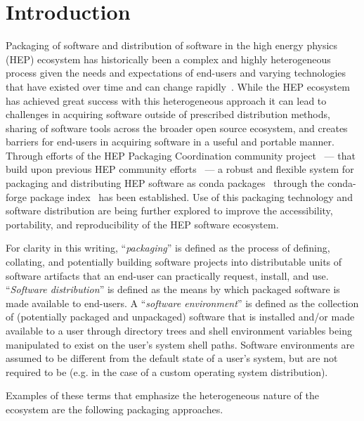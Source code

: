 \section{Introduction}\label{sec:introduction}

Packaging of software and distribution of software in the high energy physics (HEP) ecosystem has historically been a complex and highly heterogeneous process given the needs and expectations of end-users and varying technologies that have existed over time and can change rapidly~\cite{Buckley:2006nm}.
While the HEP ecosystem has achieved great success with this heterogeneous approach it can lead to challenges in acquiring software outside of prescribed distribution methods, sharing of software tools across the broader open source ecosystem, and creates barriers for end-users in acquiring software in a useful and portable manner.
Through efforts of the HEP Packaging Coordination community project~\cite{matthew_feickert_chep_2026} --- that build upon previous HEP community efforts~\cite{Burr:2699537} --- a robust and flexible system for packaging and distributing HEP software as conda packages~\cite{conda_software} through the conda-forge package index~\cite{conda_forge} has been established.
Use of this packaging technology and software distribution are being further explored to improve the accessibility, portability, and reproducibility of the HEP software ecosystem.

For clarity in this writing, ``\emph{packaging}'' is defined as the process of defining, collating, and potentially building software projects into distributable units of software artifacts that an end-user can practically request, install, and use.
``\emph{Software distribution}'' is defined as the means by which packaged software is made available to end-users.
A ``\emph{software environment}'' is defined as the collection of (potentially packaged and unpackaged) software that is installed and/or made available to a user through directory trees and shell environment variables being manipulated to exist on the user's system shell paths.
Software environments are assumed to be different from the default state of a user's system, but are not required to be (e.g. in the case of a custom operating system distribution).

Examples of these terms that emphasize the heterogeneous nature of the ecosystem are the following packaging approaches.

